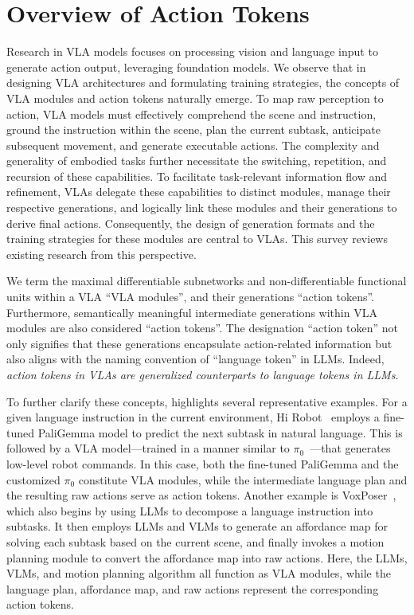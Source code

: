 \documentclass[10pt, a4paper, logo, copyright]{googledeepmind} %
\begin{document}
\section{Overview of Action Tokens}
\label{sec:overview-of-action-tokens}

Research in VLA models focuses on processing vision and language input to generate action output, leveraging foundation models. We observe that in designing VLA architectures and formulating training strategies, the concepts of VLA modules and action tokens naturally emerge. To map raw perception to action, VLA models must effectively comprehend the scene and instruction, ground the instruction within the scene, plan the current subtask, anticipate subsequent movement, and generate executable actions. The complexity and generality of embodied tasks further necessitate the switching, repetition, and recursion of these capabilities. To facilitate task-relevant information flow and refinement, VLAs delegate these capabilities to distinct modules, manage their respective generations, and logically link these modules and their generations to derive final actions. Consequently, the design of generation formats and the training strategies for these modules are central to VLAs. This survey reviews existing research from this perspective.

We term the maximal differentiable subnetworks and non-differentiable functional units within a VLA ``VLA modules'', and their generations ``action tokens''. Furthermore, semantically meaningful intermediate generations within VLA modules are also considered ``action tokens''. The designation ``action token'' not only signifies that these generations encapsulate action-related information but also aligns with the naming convention of ``language token'' in LLMs. Indeed, \emph{action tokens in VLAs are generalized counterparts to language tokens in LLMs.}

To further clarify these concepts,  highlights several representative examples. For a given language instruction in the current environment, Hi Robot~\cite{shi2025hi} employs a fine-tuned PaliGemma model to predict the next subtask in natural language. This is followed by a VLA model—trained in a manner similar to $\pi_0$~\cite{black2410pi0}—that generates low-level robot commands. In this case, both the fine-tuned PaliGemma and the customized $\pi_0$ constitute VLA modules, while the intermediate language plan and the resulting raw actions serve as action tokens. Another example is VoxPoser~\cite{huang2023voxposer}, which also begins by using LLMs to decompose a language instruction into subtasks. It then employs LLMs and VLMs to generate an affordance map for solving each subtask based on the current scene, and finally invokes a motion planning module to convert the affordance map into raw actions. Here, the LLMs, VLMs, and motion planning algorithm all function as VLA modules, while the language plan, affordance map, and raw actions represent the corresponding action tokens.
\end{document}
